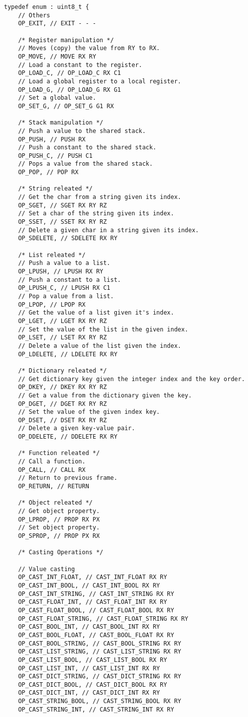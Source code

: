 \begin{code}
\begin{verbatim}
typedef enum : uint8_t {
    // Others
    OP_EXIT, // EXIT - - -

    /* Register manipulation */
    // Moves (copy) the value from RY to RX.
    OP_MOVE, // MOVE RX RY
    // Load a constant to the register.
    OP_LOAD_C, // OP_LOAD_C RX C1
    // Load a global register to a local register.
    OP_LOAD_G, // OP_LOAD_G RX G1
    // Set a global value.
    OP_SET_G, // OP_SET_G G1 RX

    /* Stack manipulation */
    // Push a value to the shared stack.
    OP_PUSH, // PUSH RX
    // Push a constant to the shared stack.
    OP_PUSH_C, // PUSH C1
    // Pops a value from the shared stack.
    OP_POP, // POP RX

    /* String releated */
    // Get the char from a string given its index.
    OP_SGET, // SGET RX RY RZ
    // Set a char of the string given its index.
    OP_SSET, // SSET RX RY RZ
    // Delete a given char in a string given its index.
    OP_SDELETE, // SDELETE RX RY

    /* List releated */
    // Push a value to a list.
    OP_LPUSH, // LPUSH RX RY
    // Push a constant to a list.
    OP_LPUSH_C, // LPUSH RX C1
    // Pop a value from a list.
    OP_LPOP, // LPOP RX
    // Get the value of a list given it's index.
    OP_LGET, // LGET RX RY RZ
    // Set the value of the list in the given index.
    OP_LSET, // LSET RX RY RZ
    // Delete a value of the list given the index.
    OP_LDELETE, // LDELETE RX RY

    /* Dictionary releated */
    // Get dictionary key given the integer index and the key order.
    OP_DKEY, // DKEY RX RY RZ
    // Get a value from the dictionary given the key.
    OP_DGET, // DGET RX RY RZ
    // Set the value of the given index key.
    OP_DSET, // DSET RX RY RZ
    // Delete a given key-value pair.
    OP_DDELETE, // DDELETE RX RY

    /* Function releated */
    // Call a function.
    OP_CALL, // CALL RX
    // Return to previous frame.
    OP_RETURN, // RETURN

    /* Object releated */
    // Get object property.
    OP_LPROP, // PROP RX PX
    // Set object property.
    OP_SPROP, // PROP PX RX

    /* Casting Operations */

    // Value casting
    OP_CAST_INT_FLOAT, // CAST_INT_FLOAT RX RY
    OP_CAST_INT_BOOL, // CAST_INT_BOOL RX RY
    OP_CAST_INT_STRING, // CAST_INT_STRING RX RY
    OP_CAST_FLOAT_INT, // CAST_FLOAT_INT RX RY
    OP_CAST_FLOAT_BOOL, // CAST_FLOAT_BOOL RX RY
    OP_CAST_FLOAT_STRING, // CAST_FLOAT_STRING RX RY
    OP_CAST_BOOL_INT, // CAST_BOOL_INT RX RY
    OP_CAST_BOOL_FLOAT, // CAST_BOOL_FLOAT RX RY
    OP_CAST_BOOL_STRING, // CAST_BOOL_STRING RX RY
    OP_CAST_LIST_STRING, // CAST_LIST_STRING RX RY
    OP_CAST_LIST_BOOL, // CAST_LIST_BOOL RX RY
    OP_CAST_LIST_INT, // CAST_LIST_INT RX RY
    OP_CAST_DICT_STRING, // CAST_DICT_STRING RX RY
    OP_CAST_DICT_BOOL, // CAST_DICT_BOOL RX RY
    OP_CAST_DICT_INT, // CAST_DICT_INT RX RY
    OP_CAST_STRING_BOOL, // CAST_STRING_BOOL RX RY
    OP_CAST_STRING_INT, // CAST_STRING_INT RX RY


\end{verbatim}
\end{code}
